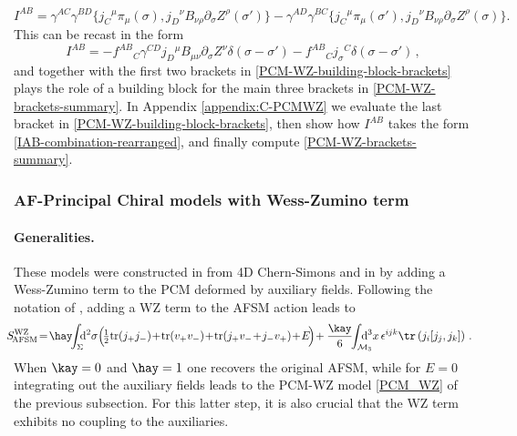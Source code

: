 \documentclass[12pt]{article}
\numberwithin{equation}{section}
\begin{document}
\begin{equation}\label{IAB-combination-definition}
\!\!\!I^{AB}\!=\!\gamma^{AC}\gamma^{BD}\{j_{C}{}^{\mu}\pi_{\mu}(\sigma),j_{D}{}^{\nu}B_{\nu\rho}\partial_{\sigma}Z^{\rho}(\sigma')\}\!-\!\gamma^{AD}\gamma^{BC}\{j_{C}{}^{\mu}\pi_{\mu}(\sigma'),j_{D}{}^{\nu}B_{\nu\rho}\partial_{\sigma}Z^{\rho}(\sigma)\}.
\end{equation}
This can be recast in the form
\begin{equation}\label{IAB-combination-rearranged}
I^{AB}=-f^{AB}{}_{C}\gamma^{CD}j_{D}{}^{\mu}B_{\mu\nu}\partial_{\sigma}Z^{\nu}\delta(\sigma-\sigma')-f^{AB}{}_{C}j_{\sigma}{}^{C}\delta(\sigma-\sigma') \, ,
\end{equation}
and together with the first two brackets in \eqref{PCM-WZ-building-block-brackets} plays the role of a building block for the main three brackets in \eqref{PCM-WZ-brackets-summary}. In Appendix \ref{appendix:C-PCMWZ} we evaluate the last bracket in \eqref{PCM-WZ-building-block-brackets}, then show how $I^{AB}$ takes the form \eqref{IAB-combination-rearranged}, and finally compute \eqref{PCM-WZ-brackets-summary}.




\subsubsection{AF-Principal Chiral models with Wess-Zumino term}\label{subsubsec:AFPCMWZ}
\paragraph{Generalities.} These models were constructed in \cite{Fukushima:2024nxm} from 4D Chern-Simons and in \cite{Bielli:2024ach} by adding a Wess-Zumino term to the PCM deformed by auxiliary fields. Following the notation of \cite{Bielli:2024ach}, adding a WZ term to the AFSM action leads to
\begin{equation}\label{AF-PCM-WZ}
\!\!\!\! S_{\!\text{AFSM}}^{\text{WZ}} \!=\! \hay \!\! \int_{\Sigma} \!\!\! \mathrm{d}^2 \sigma  \Bigl( \! \tfrac{1}{2} \mathrm{tr} ( j_+ j_- ) \!+\! \mathrm{tr} ( v_+ v_- ) \!+\! \mathrm{tr} ( j_+ v_- \!+\! j_- v_+ ) \!+\! E  \! \Bigr)  
\!+ \frac{\kay}{6}\!\! \int_{\mathcal{M}_3} \!\!\!\!\!\!\! \mathrm{d}^3 x \, \epsilon^{ijk} \tr \left( j_i [ j_j, j_k ] \right) \,.
\end{equation}
When $\kay=0$ and $\hay=1$ one recovers the original AFSM, while for $E=0$ integrating out the auxiliary fields leads to the PCM-WZ model \eqref{PCM_WZ} of the previous subsection. For this latter step, it is also crucial that the WZ term exhibits no coupling to the auxiliaries.
\end{document}
